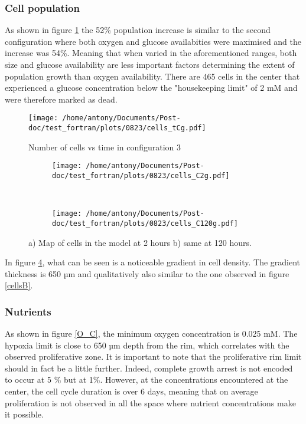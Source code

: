 \documentclass[11pt,a4paper]{article}
\begin{document}
\subsubsection{Cell population}

As shown in figure \ref{cells_tC} the 52\% population increase is similar to the second configuration where both oxygen and glucose availabities were maximised and the increase was 54\%. Meaning that when varied in the aforementioned ranges, both size and glucose availability are less important factors determining the extent of population growth than oxygen availability. There are 465 cells in the center that experienced a glucose concentration below the "housekeeping limit" of 2 mM and were therefore marked as dead.

\begin{figure}[ht!]
\begin{center}
\texttt{[image: /home/antony/Documents/Post-doc/test\_fortran/plots/0823/cells\_tCg.pdf]}
\caption{Number of cells vs time in configuration 3\label{cells_tC}}
\end{center}
\end{figure}

\begin{figure}[ht!]
	\begin{subfigure}{0.5\textwidth}
	\centering
	\texttt{[image: /home/antony/Documents/Post-doc/test\_fortran/plots/0823/cells\_C2g.pdf]}
	\caption{ \label{cellsC2}}
	\end{subfigure}
	~~
	\begin{subfigure}{0.5\textwidth}
	\texttt{[image: /home/antony/Documents/Post-doc/test\_fortran/plots/0823/cells\_C120g.pdf]}
		\caption{ \label{cellC120}}
	\end{subfigure}
	\caption{a) Map of cells in the model at 2 hours b) same at 120 hours.\label{cellsC}}
	\end{figure}

In figure \ref{cellsC}, what can be seen is a noticeable gradient in cell density. The gradient thickness is 650 µm and qualitatively also similar to the one observed in figure \ref{cellsB}. 

\subsubsection{Nutrients}
As shown in figure \ref{O_C}, the minimum oxygen concentration is 0.025 mM. The hypoxia limit is close to 650 µm depth from the rim, which correlates with the observed proliferative zone.  It is important to note that the proliferative rim limit should in fact be a little further. Indeed, complete growth arrest is not encoded to occur at 5 \% but at 1\%. However, at the concentrations encountered at the center, the cell cycle duration is over 6 days, meaning that on average proliferation is not observed in all the space where nutrient concentrations make it possible.
\end{document}
